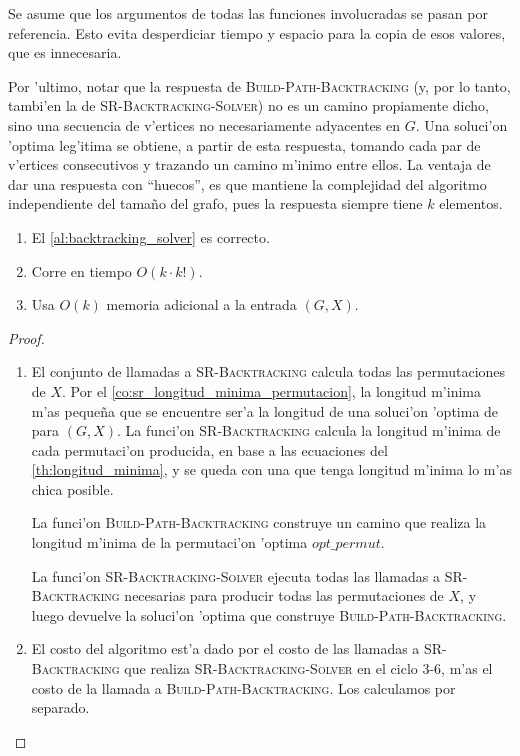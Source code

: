 Se asume que los argumentos de todas las funciones involucradas se pasan por referencia. Esto evita desperdiciar tiempo y espacio para la copia de esos valores, que es innecesaria.

Por 'ultimo, notar que la respuesta de \textsc{Build-Path-Backtracking} (y, por lo tanto, tambi'en la de \textsc{SR-Backtracking-Solver}) no es un camino propiamente dicho, sino una secuencia de v'ertices no necesariamente adyacentes en $G$. Una soluci'on 'optima leg'itima se obtiene, a partir de esta respuesta, tomando cada par de v'ertices consecutivos y trazando un camino m'inimo entre ellos. La ventaja de dar una respuesta con ``huecos'', es que mantiene la complejidad del algoritmo independiente del tama\~no del grafo, pues la respuesta siempre tiene $k$ elementos.

\begin{theorem}
\label{th:backtracking_correcto_complejidad}
\hfill
\begin{enumerate}
\item El \autoref{al:backtracking_solver} es correcto.
\item Corre en tiempo $O(k \cdot k!)$.
\item Usa $O(k)$ memoria adicional a la entrada $(G, X)$.
\end{enumerate}

\begin{proof}
\hfill
\begin{enumerate}
\item El conjunto de llamadas a \textsc{SR-Backtracking} calcula todas las permutaciones de $X$. Por el \autoref{co:sr_longitud_minima_permutacion}, la longitud m'inima m'as peque\~na que se encuentre ser'a la longitud de una soluci'on 'optima de  para $(G, X)$. La funci'on \textsc{SR-Backtracking} calcula la longitud m'inima de cada permutaci'on producida, en base a las ecuaciones del \autoref{th:longitud_minima}, y se queda con una que tenga longitud m'inima lo m'as chica posible.

La funci'on \textsc{Build-Path-Backtracking} construye un camino que realiza la longitud m'inima de la permutaci'on 'optima $opt\_permut$.

La funci'on \textsc{SR-Backtracking-Solver} ejecuta todas las llamadas a \textsc{SR-Backtracking} necesarias para producir todas las permutaciones de $X$, y luego devuelve la soluci'on 'optima que construye \textsc{Build-Path-Backtracking}.

\item El costo del algoritmo est'a dado por el costo de las llamadas a \textsc{SR-Backtracking} que realiza \textsc{SR-Backtracking-Solver} en el ciclo 3-6, m'as el costo de la llamada a \textsc{Build-Path-Backtracking}. Los calculamos por separado.


\end{enumerate}
\end{proof}
\end{theorem}
